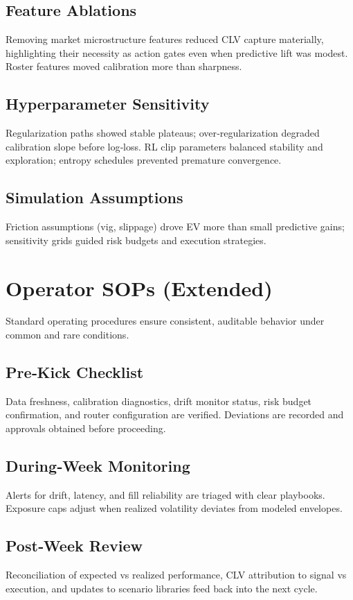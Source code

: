 \documentclass[12pt]{report}  %
\numberwithin{equation}{section}
\theoremstyle{plain}
\theoremstyle{definition}
\theoremstyle{remark}
\begin{document}
\section{Feature Ablations}
Removing market microstructure features reduced CLV capture materially, highlighting their necessity as action gates even when predictive lift was modest. Roster features moved calibration more than sharpness.

\section{Hyperparameter Sensitivity}
Regularization paths showed stable plateaus; over‑regularization degraded calibration slope before log‑loss. RL clip parameters balanced stability and exploration; entropy schedules prevented premature convergence.

\section{Simulation Assumptions}
Friction assumptions (vig, slippage) drove EV more than small predictive gains; sensitivity grids guided risk budgets and execution strategies.

\chapter{Operator SOPs (Extended)}
Standard operating procedures ensure consistent, auditable behavior under common and rare conditions.

\section{Pre‑Kick Checklist}
Data freshness, calibration diagnostics, drift monitor status, risk budget confirmation, and router configuration are verified. Deviations are recorded and approvals obtained before proceeding.

\section{During‑Week Monitoring}
Alerts for drift, latency, and fill reliability are triaged with clear playbooks. Exposure caps adjust when realized volatility deviates from modeled envelopes.

\section{Post‑Week Review}
Reconciliation of expected vs realized performance, CLV attribution to signal vs execution, and updates to scenario libraries feed back into the next cycle.
\end{document}
